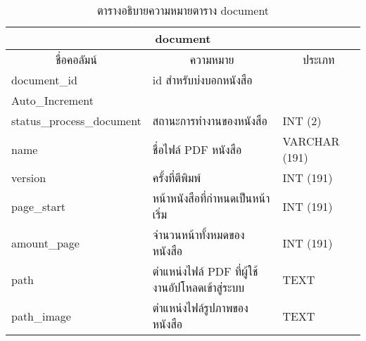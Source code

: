 \begin{longtable}[l]{|l|l|l|}
\caption{ตารางอธิบายความหมายตาราง document}
\label{tbl:document}
\endfirsthead
\endhead
\hline
\multicolumn{3}{|c|}{document}                                                                \\ \hline
\multicolumn{1}{|c|}{ชื่อคอลัมน์}      & \multicolumn{1}{c|}{ความหมาย}                    & \multicolumn{1}{c|}{ประเภท}                                                       \\ \hline 
document\_id                         & id สำหรับบ่งบอกหนังสือ                                        & \begin{tabular}[c]{@{}l@{}}INT(10)   \\ Auto\_Increment\end{tabular} \\ \hline
status\_process\_document            & สถานะการทำงานของหนังสือ                                       & INT   (2)                                                            \\ \hline
name                                 & ชื่อไฟล์ PDF หนังสือ                                          & VARCHAR   (191)                                                      \\ \hline
version                              & ครั้งที่ตีพิมพ์                                              & INT   (191)                                                          \\ \hline
page\_start                          & หน้าหนังสือที่กำหนดเป็นหน้าเริ่ม                              & INT   (191)                                                          \\ \hline
amount\_page                         & จำนวนหน้าทั้งหมดของหนังสือ                                    & INT   (191)                                                          \\ \hline
path                                 & ตำแหน่งไฟล์ PDF ที่ผู้ใช้งานอัปโหลดเข้าสู่ระบบ               & TEXT                                                                 \\ \hline
path\_image                          & ตำแหน่งไฟล์รูปภาพของหนังสือ                                   & TEXT                                                                 \\ \hline

\end{longtable}

